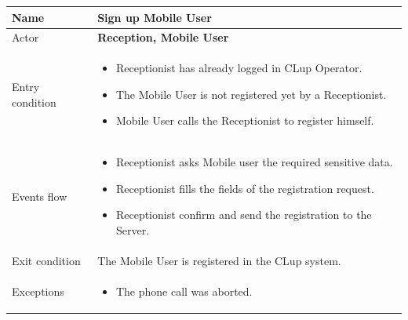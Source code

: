  \par \medskip
 
 \begin{tabular}{|p{5cm} | p{7cm} | }
 	\hline
 	Name & \textbf{Sign up Mobile User}  \\
 	\hline
 	Actor & \textbf{Reception, Mobile User} \\
 	\hline
 	Entry condition &
 	\begin{itemize}
 		\item Receptionist has already logged in CLup Operator. 
 		\item The Mobile User is not registered yet by a Receptionist.
        \item Mobile User calls the Receptionist to register himself.
 	\end{itemize} \\
 	\hline
 	Events flow & 
 	\begin{itemize}
 		\item Receptionist asks Mobile user the required sensitive data.
 		\item Receptionist fills the fields of the registration request.
 		\item Receptionist confirm and send the registration to the Server.
 	\end{itemize} \\
 	\hline
 	Exit condition &
 	The Mobile User is registered in the CLup system. \\
 	\hline 
 	Exceptions & 
 	\begin{itemize}
 		\item The phone call was aborted.
 	\end{itemize} \\
 	\hline
 \end{tabular}

